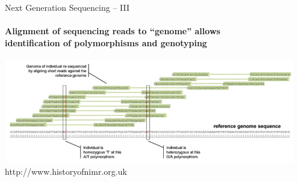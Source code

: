 \documentclass[letter,graphicx]{beamer}
\begin{document}
\begin{frame}{Next Generation Sequencing -- III}
\framesubtitle{Alignment of sequencing reads to ``genome'' allows \\
identification of polymorphisms and genotyping}
{\centering
\includegraphics[width=0.95\textwidth]{mhap_figs/alignment.png}
}\\
{\tiny http://www.historyofnimr.org.uk}
\end{frame}
\end{document}

